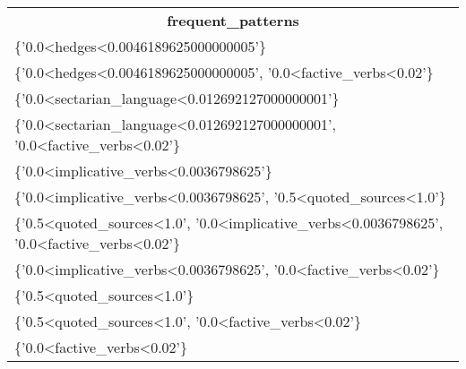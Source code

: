 \begin{tabular}{ll}
\multicolumn{2}{c}{\textbf{frequent\_patterns}}                                                                                                                                   \\
\multicolumn{2}{l}{\{'0.0\textless{}hedges\textless{}0.0046189625000000005'\}}                                                                                                    \\
\multicolumn{2}{l}{\{'0.0\textless{}hedges\textless{}0.0046189625000000005',   '0.0\textless{}factive\_verbs\textless{}0.02'\}}                                                   \\
\multicolumn{2}{l}{\{'0.0\textless{}sectarian\_language\textless{}0.012692127000000001'\}}                                                                                        \\
\multicolumn{2}{l}{\{'0.0\textless{}sectarian\_language\textless{}0.012692127000000001',   '0.0\textless{}factive\_verbs\textless{}0.02'\}}                                       \\
\multicolumn{2}{l}{\{'0.0\textless{}implicative\_verbs\textless{}0.0036798625'\}}                                                                                                 \\
\multicolumn{2}{l}{\{'0.0\textless{}implicative\_verbs\textless{}0.0036798625',   '0.5\textless{}quoted\_sources\textless{}1.0'\}}                                                \\
\multicolumn{2}{l}{\{'0.5\textless{}quoted\_sources\textless{}1.0',   '0.0\textless{}implicative\_verbs\textless{}0.0036798625', '0.0\textless{}factive\_verbs\textless{}0.02'\}} \\
\multicolumn{2}{l}{\{'0.0\textless{}implicative\_verbs\textless{}0.0036798625',   '0.0\textless{}factive\_verbs\textless{}0.02'\}}                                                \\
\multicolumn{2}{l}{\{'0.5\textless{}quoted\_sources\textless{}1.0'\}}                                                                                                             \\
\multicolumn{2}{l}{\{'0.5\textless{}quoted\_sources\textless{}1.0',   '0.0\textless{}factive\_verbs\textless{}0.02'\}}                                                            \\
\multicolumn{2}{l}{\{'0.0\textless{}factive\_verbs\textless{}0.02'\}}                                                                                                            
\end{tabular}